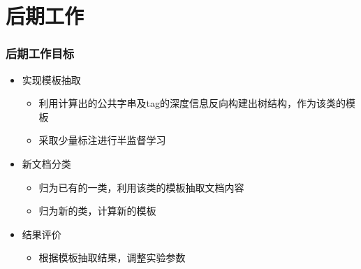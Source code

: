 \documentclass[11pt,presentation]{beamer}
\begin{document}
\section{后期工作}
\label{sec-5}
\begin{frame}
\frametitle{后期工作目标}
\label{sec-5-1}
\begin{itemize}

\item 实现模板抽取
\label{sec-5-1-1}%
\begin{itemize}
\item 利用计算出的公共字串及tag的深度信息反向构建出树结构，作为该类的模板
\item 采取少量标注进行半监督学习
\end{itemize}

\item 新文档分类
\label{sec-5-1-2}%
\begin{itemize}
\item 归为已有的一类，利用该类的模板抽取文档内容
\item 归为新的类，计算新的模板
\end{itemize}

\item 结果评价
\label{sec-5-1-3}%
\begin{itemize}
\item 根据模板抽取结果，调整实验参数
\end{itemize}
\end{itemize} %
\end{frame}
\end{document}
